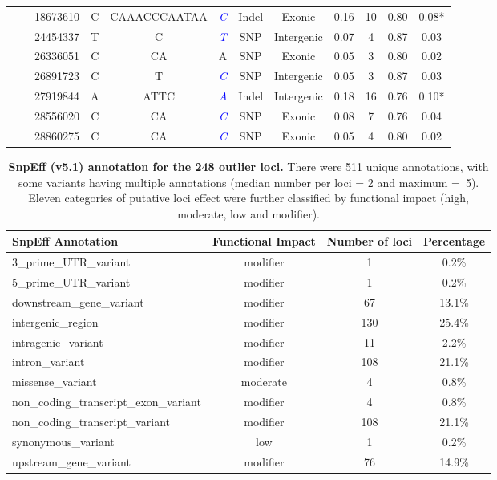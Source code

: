 \begin{table}[!b]
\begin{center}
\begin{tabular}{ccS[table-format=8.0]ccccccS[table-format=2.0]S[table-format=1.2]S[table-format=1.3]}
 &  & 18673610 & C & CAAACCCAATAA & \textcolor{blue}{\textit{C}} & Indel & Exonic & 0.16 & 10 & 0.80 & 0.08*\\
 &  & 24454337 & T & C & \textcolor{blue}{\textit{T}} & SNP & Intergenic & 0.07 & 4 & 0.87 & 0.03\\
 &  & 26336051 & C & CA & A & SNP & Exonic & 0.05 & 3 & 0.80 & 0.02\\
 &  & 26891723 & C & T & \textcolor{blue}{\textit{C}} & SNP & Intergenic & 0.05 & 3 & 0.87 & 0.03\\
 &  & 27919844 & A & ATTC & \textcolor{blue}{\textit{A}} & Indel & Intergenic & 0.18 & 16 & 0.76 & 0.10*\\
 &  & 28556020 & C & CA & \textcolor{blue}{\textit{C}} & SNP & Exonic & 0.08 & 7 & 0.76 & 0.04\\
 &  & 28860275 & C & CA & \textcolor{blue}{\textit{C}} & SNP & Exonic & 0.05 & 4 & 0.80 & 0.02\\
\bottomrule
\end{tabular}
\end{center}
\end{table}

\begin{table}[!b]
\renewcommand{\arraystretch}{1}
\begin{center}
\small
\caption[SnpEff (v5.1) annotation for the 248 outlier loci.]{\textbf{SnpEff (v5.1) annotation for the 248 outlier loci.} There were 511 unique annotations, with some variants having multiple annotations (median number per loci = 2 and maximum =~5). Eleven categories of putative loci effect were further classified by functional impact (high, moderate, low and modifier). }
\label{tab:DNAsuppSnpEff}
\begin{tabular}{lcS[table-format=3.0]S[table-format=2.1]}
\toprule
\textbf{SnpEff Annotation} & \textbf{Functional Impact} &
\textbf{Number of loci} & \textbf{Percentage}\\
\_prime\_UTR\_variant&modifier&1&0.2\%\\
5\_prime\_UTR\_variant&modifier&1&0.2\%\\
downstream\_gene\_variant&modifier&67&13.1\%\\
intergenic\_region&modifier&130&25.4\%\\
intragenic\_variant&modifier&11&2.2\%\\
intron\_variant&modifier&108&21.1\%\\
missense\_variant&moderate&4&0.8\%\\
non\_coding\_transcript\_exon\_variant&modifier&4&0.8\%\\
non\_coding\_transcript\_variant&modifier&108&21.1\%\\
synonymous\_variant&low&1&0.2\%\\
upstream\_gene\_variant&modifier&76&14.9\%\\
\bottomrule
\end{tabular}
\end{center}
\end{table}

